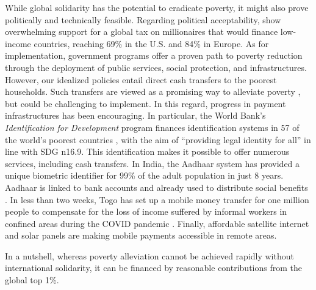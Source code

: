 While global solidarity has the potential to eradicate poverty, it might also prove politically and technically feasible. 
Regarding political acceptability, \cite{fabre_international_2023} show overwhelming support for a global tax on millionaires that would finance low-income countries, reaching 69\% in the U.S. and 84\% in Europe. %
As for implementation, government programs offer a proven path to poverty reduction through the deployment of public services, social protection, and infrastructures. 
However, our idealized policies entail direct cash transfers to the poorest households. Such transfers are viewed as a promising way to alleviate poverty \citep{haushofer_short-term_2016,egger_general_2022}, but could be challenging to implement. In this regard, progress in payment infrastructures has been encouraging. In particular, the World Bank's \textit{Identification for Development} program finances identification systems in 57 of the world's poorest countries \citep{world_bank_state_2017,world_bank_benin_2020,world_bank_identification_2022}, with the aim of ``providing legal identity for all'' in line with SDG n\textdegree{}16.9. This identification makes it possible to offer numerous services, including cash transfers. In India, the Aadhaar system has provided a unique biometric identifier for 99\% of the adult population in just 8 years. Aadhaar is linked to bank accounts and already used to distribute social benefits \citep{muralidharan_identity_2023}. In less than two weeks, Togo has set up a mobile money transfer for one million people to compensate for the loss of income suffered by informal workers in confined areas during the COVID pandemic \citep{ipa_togos_2021}. Finally, affordable satellite internet and solar panels are making mobile payments accessible in remote areas. %

In a nutshell, whereas poverty alleviation cannot be achieved rapidly without international solidarity, it can be financed by reasonable contributions from the global top 1\%.

